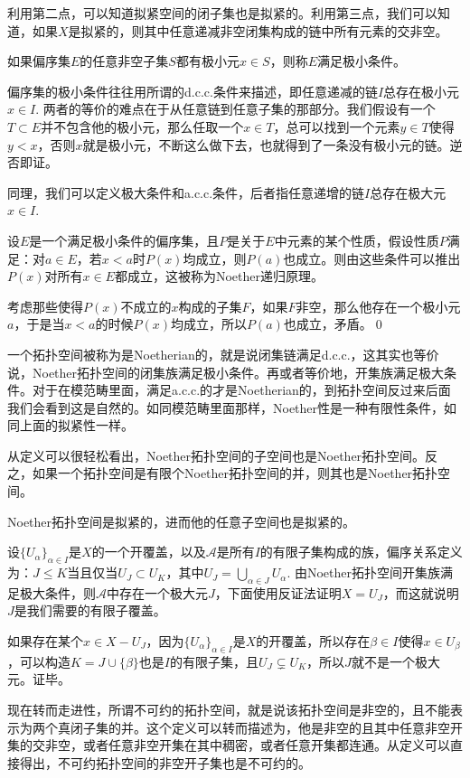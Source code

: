 \para 利用第二点，可以知道拟紧空间的闭子集也是拟紧的。利用第三点，我们可以知道，如果$X$是拟紧的，则其中任意递减非空闭集构成的链中所有元素的交非空。

\para 如果偏序集$E$的任意非空子集$S$都有极小元$x\in S$，则称$E$满足极小条件。

偏序集的极小条件往往用所谓的d.c.c.条件来描述，即任意递减的链$I$总存在极小元$x\in I$. 两者的等价的难点在于从任意链到任意子集的那部分。我们假设有一个$T\subset E$并不包含他的极小元，那么任取一个$x\in T$，总可以找到一个元素$y\in T$使得$y<x$，否则$x$就是极小元，不断这么做下去，也就得到了一条没有极小元的链。逆否即证。

同理，我们可以定义极大条件和a.c.c.条件，后者指任意递增的链$I$总存在极大元$x\in I$.

\pro 设$E$是一个满足极小条件的偏序集，且$P$是关于$E$中元素的某个性质，假设性质$P$满足：对$a\in E$，若$x< a$时$P(x)$均成立，则$P(a)$也成立。则由这些条件可以推出$P(x)$对所有$x\in E$都成立，这被称为Noether递归原理。

\proof 考虑那些使得$P(x)$不成立的$x$构成的子集$F$，如果$F$非空，那么他存在一个极小元$a$，于是当$x< a$的时候$P(x)$均成立，所以$P(a)$也成立，矛盾。\qed

\para 一个拓扑空间被称为是Noetherian的，就是说闭集链满足d.c.c.，这其实也等价说，Noether拓扑空间的闭集族满足极小条件。再或者等价地，开集族满足极大条件。对于在模范畴里面，满足a.c.c.的才是Noetherian的，到拓扑空间反过来后面我们会看到这是自然的。如同模范畴里面那样，Noether性是一种有限性条件，如同上面的拟紧性一样。

\para 从定义可以很轻松看出，Noether拓扑空间的子空间也是Noether拓扑空间。反之，如果一个拓扑空间是有限个Noether拓扑空间的并，则其也是Noether拓扑空间。

\para Noether拓扑空间是拟紧的，进而他的任意子空间也是拟紧的。

设$\{U_\alpha\}_{\alpha\in I}$是$X$的一个开覆盖，以及$\mathscr{A}$是所有$I$的有限子集构成的族，偏序关系定义为：$J\leq K$当且仅当$U_J\subset U_K$，其中$U_J=\bigcup_{\alpha\in J}U_\alpha$. 由Noether拓扑空间开集族满足极大条件，则$\mathscr{A}$中存在一个极大元$J$，下面使用反证法证明$X=U_J$，而这就说明$J$是我们需要的有限子覆盖。

如果存在某个$x\in X-U_J$，因为$\{U_\alpha\}_{\alpha\in I}$是$X$的开覆盖，所以存在$\beta \in I$使得$x\in U_\beta$，可以构造$K=J\cup \{\beta\}$也是$I$的有限子集，且$U_J\subsetneq U_K$，所以$J$就不是一个极大元。证毕。

\para 现在转而走进性，所谓不可约的拓扑空间，就是说该拓扑空间是非空的，且不能表示为两个真闭子集的并。这个定义可以转而描述为，他是非空的且其中任意非空开集的交非空，或者任意非空开集在其中稠密，或者任意开集都连通。从定义可以直接得出，不可约拓扑空间的非空开子集也是不可约的。

